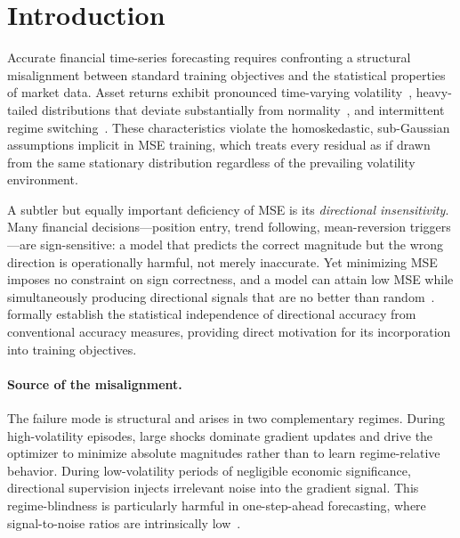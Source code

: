 \documentclass[11pt]{article}
\begin{document}
\section{Introduction}
\label{sec:intro}

Accurate financial time-series forecasting requires confronting a
structural misalignment between standard training objectives and the
statistical properties of market data. Asset returns exhibit
pronounced time-varying volatility~\citep{engle1982autoregressive,
bollerslev1986generalized}, heavy-tailed distributions that deviate
substantially from normality~\citep{mandelbrot1963variation,
cont2001empirical}, and intermittent regime
switching~\citep{hamilton1989new}. These characteristics violate the
homoskedastic, sub-Gaussian assumptions implicit in MSE training, which
treats every residual as if drawn from the same stationary distribution
regardless of the prevailing volatility environment.

A subtler but equally important deficiency of MSE is its
\emph{directional insensitivity}.
Many financial decisions---position entry, trend
following, mean-reversion triggers---are sign-sensitive: a model that
predicts the correct magnitude but the wrong direction is operationally
harmful, not merely inaccurate. Yet minimizing MSE imposes no
constraint on sign correctness, and a model can attain low MSE
while simultaneously producing directional signals that are no better
than random~\citep{leitch1991economic}. \citet{pesaran1992simple}
formally establish the statistical independence of directional accuracy
from conventional accuracy measures, providing direct motivation for
its incorporation into training objectives.

\paragraph{Source of the misalignment.}
The failure mode is structural and arises in two complementary
regimes. During high-volatility episodes, large shocks dominate
gradient updates and drive the optimizer to minimize absolute
magnitudes rather than to learn regime-relative behavior. During
low-volatility periods of negligible economic significance, directional
supervision injects irrelevant noise into the gradient signal.
This regime-blindness is particularly harmful in one-step-ahead
forecasting, where signal-to-noise ratios are intrinsically
low~\citep{cao2001financial,gu2020empirical}.
\end{document}
